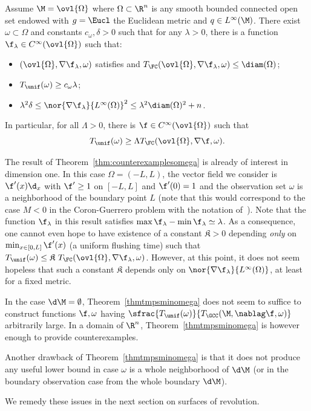 \begin{theorem}
\label{thm:counterexamplesomega}
Assume $\M = \ovl{\Omega}$ where $\Omega \subset \R^n$ is any smooth bounded connected open set endowed with $g=\Eucl$ the Euclidean metric and $q \in L^\infty(\M)$. There exist $\omega\subset \Omega$ and constants $c_\omega,\delta>0$ such that for any $\lambda>0$, there is a function $\f_\lambda \in C^\infty(\ovl{\Omega})$ such that:
\begin{itemize}
\item $(\ovl{\Omega},\nabla \f_\lambda,\omega)$ satisfies \pFC and $T_{\FC}(\ovl{\Omega},\nabla \f_\lambda,\omega) \leq \diam(\Omega)$;
\item $T_{\unif}(\omega)\geq c_\omega \lambda$;
\item $ \lambda^2\delta\leq \nor{\nabla \f_\lambda}{L^\infty(\Omega)}^2 \leq \lambda^2 \diam(\Omega)^{2}+n$.
\end{itemize}
In particular, for all $\Lambda >0$, there is $\f \in C^\infty(\ovl{\Omega})$ such that
\[
T_{\unif}(\omega) \geq \Lambda T_{\FC}(\ovl{\Omega},\nabla \f,\omega).
\]
\end{theorem}
The result of Theorem~\ref{thm:counterexamplesomega} is already of interest in dimension one. In this case $\Omega = (-L,L)$, the vector field we consider is $\f'(x)\d_x$ with $\f'\geq 1$ on $[-L,L]$ and $\f'(0)=1$ and the observation set $\omega$ is a neighborhood of the boundary point $L$ (note that this would correspond to the case $M<0$ in the Coron-Guerrero problem with the notation of~\cite{CG:05}).
Note that the function $\f_\lambda$ in this result satisfies $\max \f_\lambda - \min \f_\lambda \simeq \lambda$.
As a consequence, one cannot even hope to have existence of a constant $\mathfrak{K}>0$ depending {\em only} on $\min_{x\in [0,L]}\f'(x)$ (a uniform flushing time) such that $T_{\unif}(\omega) \leq \mathfrak{K} \ T_{\FC}(\ovl{\Omega},\nabla \f_\lambda,\omega)$.
However, at this point, it does not seem hopeless that such a constant $\mathfrak{K}$ depends only on $\nor{\nabla \f_\lambda}{L^\infty(\Omega)}$, at least for a fixed metric.

\begin{remark}
In the case $\d\M = \emptyset$, Theorem~\ref{thmtmpsminomega} does not seem to suffice to construct functions $\f, \omega$ having $\sfrac{T_{\unif}(\omega)}{T_{\GCC}(\M,\nablag\f,\omega)}$ arbitrarily large. In a domain of $\R^n$, Theorem~\ref{thmtmpsminomega} is however enough to provide counterexamples.

Another drawback of Theorem~\ref{thmtmpsminomega} is that it does not produce any useful lower bound in case $\omega$ is a whole neighborhood of $\d\M$ (or in the boundary observation case from the whole boundary $\d\M$).

We remedy these issues in the next section on surfaces of revolution.
\end{remark}

